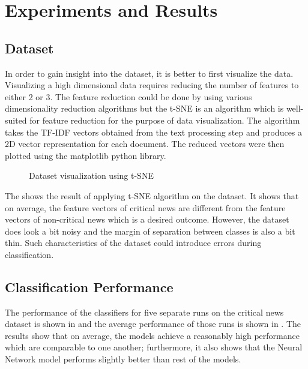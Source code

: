 \chapter{Experiments and Results} \label{result}

\section{Dataset}
In order to gain insight into the dataset, it is better to first visualize the data. Visualizing a high dimensional data requires reducing the number of features to either 2 or 3. The feature reduction could be done by using various dimensionality reduction algorithms \cite{tenenbaum2000global, roweis2000nonlinear} but the t-SNE\cite{maaten2008visualizing} is an algorithm which is well-suited for feature reduction for the purpose of data visualization. The algorithm takes the TF-IDF vectors obtained from the text processing step and produces a 2D vector representation for each document. The reduced vectors were then plotted using the matplotlib\cite{hunter2007matplotlib} python library. 

\begin{figure}[h]
    \caption{Dataset visualization using t-SNE}
    \label{fig:dataset}
\end{figure}

The  shows the result of applying t-SNE algorithm on the dataset. It shows that on average, the feature vectors of critical news are different from the feature vectors of non-critical news which is a desired outcome. However, the dataset does look a bit noisy and the margin of separation between classes is also a bit thin. Such characteristics of the dataset could introduce errors during classification.

\section{Classification Performance}
The performance of the classifiers for five separate runs on the critical news dataset is shown in  and the average performance of those runs is shown in . The results show that on average, the models achieve a reasonably high performance which are comparable to one another; furthermore, it also shows that the Neural Network model performs slightly better than rest of the models.

